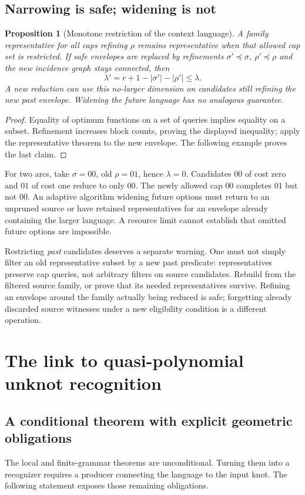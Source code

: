 \documentclass[11pt,a4paper]{article}
\newtheorem{proposition}[theorem]{Proposition}
\theoremstyle{definition}
\theoremstyle{remark}
\begin{document}
\subsection{Narrowing is safe; widening is not}
\begin{proposition}[Monotone restriction of the context language]\label{prop:monotone}
A family representative for all caps refining $\rho$ remains representative when that
allowed cap set is restricted. If safe envelopes are replaced by refinements
$\sigma'\preceq\sigma$, $\rho'\preceq\rho$ and the new incidence graph stays connected,
then
\[
                  \lambda'=r+1-|\sigma'|-|\rho'|\le\lambda.
\]
A new reduction can use this no-larger dimension on candidates still refining the new
past envelope. Widening the future language has no analogous guarantee.
\end{proposition}
\begin{proof}
Equality of optimum functions on a set of queries implies equality on a subset.
Refinement increases block counts, proving the displayed inequality; apply the
representative theorem to the new envelope. The following example proves the last claim.
\end{proof}

For two arcs, take $\sigma=00$, old $\rho=01$, hence $\lambda=0$. Candidates $00$ of
cost zero and $01$ of cost one reduce to only $00$. The newly allowed cap $00$ completes
$01$ but not $00$. An adaptive algorithm widening future options must return to an
unpruned source or have retained representatives for an envelope already containing the
larger language. A resource limit cannot establish that omitted future options are impossible.

Restricting \emph{past} candidates deserves a separate warning. One must not simply filter
an old representative subset by a new past predicate: representatives preserve cap queries,
not arbitrary filters on source candidates. Rebuild from the filtered source family, or
prove that its needed representatives survive. Refining an envelope around the family
actually being reduced is safe; forgetting already discarded source witnesses under a
new eligibility condition is a different operation.

\section{The link to quasi-polynomial unknot recognition}\label{sec:integration}
\subsection{A conditional theorem with explicit geometric obligations}
The local and finite-grammar theorems are unconditional. Turning them into a recognizer
requires a producer connecting the language to the input knot. The following statement
exposes those remaining obligations.
\end{document}
